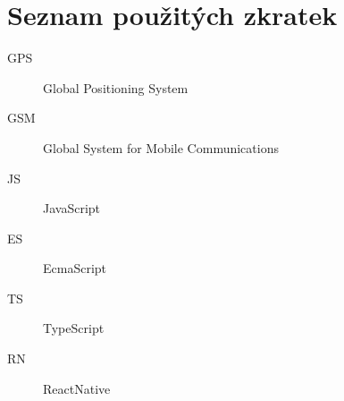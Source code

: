 \chapter*{Seznam použitých zkratek}

\begin{multicols}{2}
\raggedright
\begin{description}
\item [GPS] Global Positioning System
\item [GSM] Global System for Mobile Communications
\item [JS] JavaScript
\item [ES] EcmaScript
\item [TS] TypeScript
\item [RN] ReactNative
\end{description}
\end{multicols}

